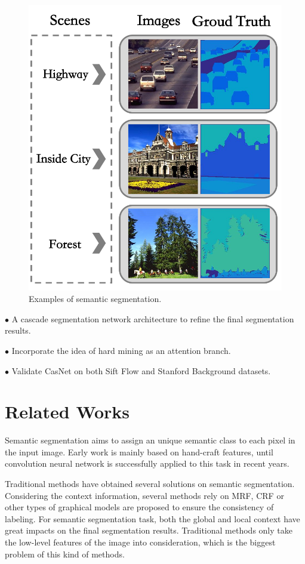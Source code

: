 \documentclass[10.5pt,compsoc]{TsT}
\newcommand{\upcite}[1]{\superscript{\textsuperscript{\cite{#1}}}}
\theoremstyle{mystyle}
\newcommand{\upcite}[1]{\textsuperscript{\cite{#1}}}
\begin{document}
{\begin{figure}
\centering
\includegraphics[width=0.95\columnwidth]{fig1.png}
\caption{Examples of semantic segmentation.}
\label{fig:example}
\end{figure} 


\noindent
  $\bullet$ A cascade segmentation network architecture to refine the final segmentation results.
  
\noindent
  $\bullet$ Incorporate the idea of hard mining as an attention branch.
  
\noindent
  $\bullet$ Validate CasNet on both Sift Flow\upcite{6} and Stanford Background\upcite{7} datasets.


\section{Related Works}
\label{s:Related}
\noindent
Semantic segmentation aims to assign an unique semantic class to each pixel in the input image. Early work is mainly based on hand-craft features, until convolution neural network is successfully applied to this task in recent years.

Traditional methods have obtained several solutions on semantic segmentation. Considering the context information, several methods rely on MRF, CRF or other types of graphical models are proposed to ensure the consistency of labeling\upcite{8,10}. For semantic segmentation task, both the global and local context have great impacts on the final segmentation results. Traditional methods only take the low-level features of the image into consideration, which is the biggest problem of this kind of methods.

}
\end{document}
